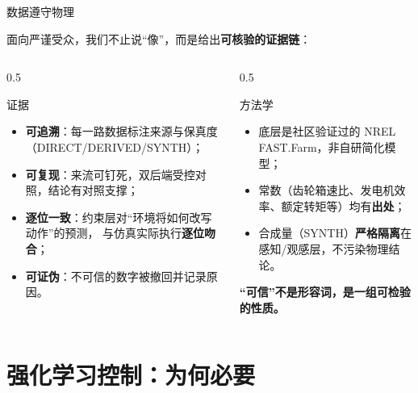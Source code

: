 \documentclass[aspectratio=169,10pt,UTF8]{ctexbeamer}
\newcommand{\hl}[1]{{\color{myblue}\bfseries #1}}
\newcommand{\hlg}[1]{{\color{mygreen}\bfseries #1}}
\begin{document}
\begin{frame}{数据遵守物理}
  \begin{center}\small
    面向严谨受众，我们不止说“像”，而是给出\hl{可核验的证据链}：
  \end{center}
  \begin{columns}[T]
    \begin{column}{0.5\textwidth}
      \begin{block}{证据}
        \begin{itemize}\scriptsize
          \item \hlg{可追溯}：每一路数据标注来源与保真度（DIRECT/DERIVED/SYNTH）；
          \item \hlg{可复现}：来流可钉死，双后端受控对照，结论有对照支撑；
          \item \hlg{逐位一致}：约束层对“环境将如何改写动作”的预测，
                与仿真实际执行\textbf{逐位吻合}；
          \item \hlg{可证伪}：不可信的数字被撤回并记录原因。
        \end{itemize}
      \end{block}
    \end{column}
    \begin{column}{0.5\textwidth}
      \begin{block}{方法学}
        \begin{itemize}\scriptsize
          \item 底层是社区验证过的 NREL FAST.Farm，非自研简化模型；
          \item 常数（齿轮箱速比、发电机效率、额定转矩等）均有\textbf{出处}；
          \item 合成量（SYNTH）\textbf{严格隔离}在感知/观感层，不污染物理结论。
        \end{itemize}
      \end{block}
      \begin{center}\scriptsize
        \hl{“可信”不是形容词，是一组可检验的性质。}
      \end{center}
    \end{column}
  \end{columns}
\end{frame}

\section{强化学习控制：为何必要}
\end{document}
